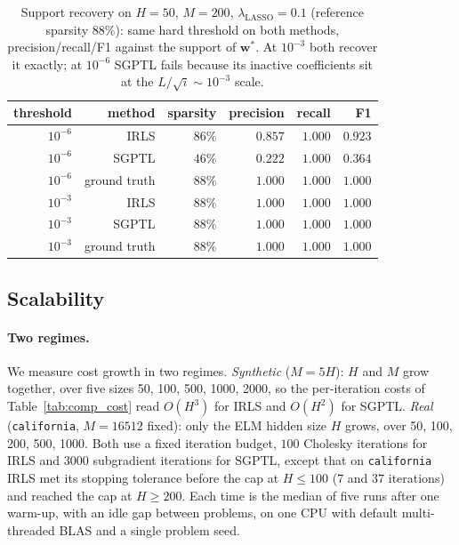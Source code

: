 \begin{table}[H]
    \centering
    \begin{tabular}{rrrrrr}
        \toprule
        threshold & method & sparsity & precision & recall & F1 \\
        \midrule
        $10^{-6}$ & IRLS  & $86\%$ & $0.857$ & $1.000$ & $0.923$ \\
        $10^{-6}$ & SGPTL & $46\%$ & $0.222$ & $1.000$ & $0.364$ \\
        $10^{-6}$ & ground truth  & $88\%$ & $1.000$ & $1.000$ & $1.000$ \\
        \midrule
        $10^{-3}$ & IRLS  & $88\%$ & $1.000$ & $1.000$ & $1.000$ \\
        $10^{-3}$ & SGPTL & $88\%$ & $1.000$ & $1.000$ & $1.000$ \\
        $10^{-3}$ & ground truth  & $88\%$ & $1.000$ & $1.000$ & $1.000$ \\
        \bottomrule
    \end{tabular}
    \caption{Support recovery on $H=50$, $M=200$,
    $\lambda_\text{LASSO}=0.1$ (reference sparsity $88\%$): same hard
    threshold on both methods, precision/recall/F1 against the support of
    $\mathbf{w}^{*}$. At $10^{-3}$ both recover it exactly; at $10^{-6}$
    SGPTL fails because its inactive coefficients sit at the
    $L/\sqrt{i}\sim 10^{-3}$ scale.}
    \label{tab:support_recovery}
\end{table}

\subsection{Scalability}
\label{sec:scalability}

\paragraph{Two regimes.}
We measure cost growth in two regimes. \emph{Synthetic} ($M=5H$): $H$ and
$M$ grow together, over five sizes 50, 100, 500, 1000, 2000, so the
per-iteration costs of Table~\ref{tab:comp_cost} read $O(H^{3})$ for IRLS and
$O(H^{2})$ for SGPTL. \emph{Real} (\texttt{california}, $M=16512$ fixed): only
the ELM hidden size $H$ grows, over 50, 100, 200, 500, 1000. Both use a fixed iteration
budget, $100$ Cholesky iterations for IRLS and $3000$ subgradient iterations
for SGPTL, except that on \texttt{california} IRLS met its stopping tolerance
before the cap at $H\le 100$ ($7$ and $37$ iterations) and reached the cap at
$H\ge 200$. Each time is the median of five runs after one warm-up, with an
idle gap between problems, on one CPU with default multi-threaded BLAS and a
single problem seed.

